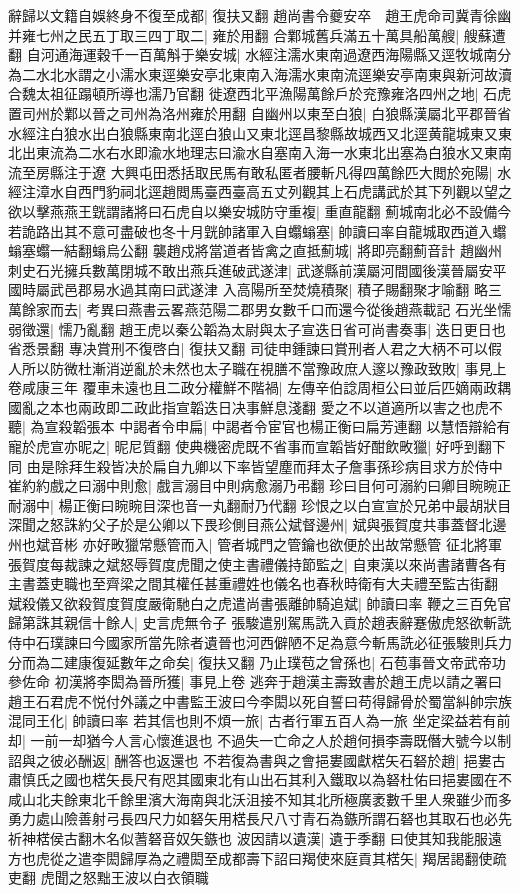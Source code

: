 辭歸以文籍自娛終身不復至成都|{
	復扶又翻}
趙尚書令夔安卒　趙王虎命司冀青徐幽并雍七州之民五丁取三四丁取二|{
	雍於用翻}
合鄴城舊兵滿五十萬具船萬艘|{
	艘蘇遭翻}
自河通海運穀千一百萬斛于樂安城|{
	水經注濡水東南過遼西海陽縣又逕牧城南分為二水北水謂之小濡水東逕樂安亭北東南入海濡水東南流逕樂安亭南東與新河故瀆合魏太祖征蹋頓所導也濡乃官翻}
徙遼西北平漁陽萬餘戶於兖豫雍洛四州之地|{
	石虎置司州於鄴以晉之司州為洛州雍於用翻}
自幽州以東至白狼|{
	白狼縣漢屬北平郡晉省水經注白狼水出白狼縣東南北逕白狼山又東北逕昌黎縣故城西又北逕黄龍城東又東北出東流為二水右水即渝水地理志曰渝水自塞南入海一水東北出塞為白狼水又東南流至房縣注于遼}
大興屯田悉括取民馬有敢私匿者腰斬凡得四萬餘匹大閲於宛陽|{
	水經注漳水自西門豹祠北逕趙閲馬臺西臺高五丈列觀其上石虎講武於其下列觀以望之}
欲以擊燕燕王皝謂諸將曰石虎自以樂安城防守重複|{
	重直龍翻}
薊城南北必不設備今若詭路出其不意可盡破也冬十月皝帥諸軍入自蠮螉塞|{
	帥讀曰率自龍城取西道入蠮螉塞蠮一結翻螉烏公翻}
襲趙戍將當道者皆禽之直抵薊城|{
	將即亮翻薊音計}
趙幽州刺史石光擁兵數萬閉城不敢出燕兵進破武遂津|{
	武遂縣前漢屬河間國後漢晉屬安平國時屬武邑郡易水過其南曰武遂津}
入高陽所至焚燒積聚|{
	積子賜翻聚才喻翻}
略三萬餘家而去|{
	考異曰燕書云畧燕范陽二郡男女數千口而還今從後趙燕載記}
石光坐懦弱徵還|{
	懦乃亂翻}
趙王虎以秦公韜為太尉與太子宣迭日省可尚書奏事|{
	迭日更日也省悉景翻}
專决賞刑不復啓白|{
	復扶又翻}
司徒申鍾諫曰賞刑者人君之大柄不可以假人所以防微杜漸消逆亂於未然也太子職在視膳不當豫政庶人邃以豫政致敗|{
	事見上卷咸康三年}
覆車未遠也且二政分權鮮不階禍|{
	左傳辛伯諗周桓公曰並后匹嫡兩政耦國亂之本也兩政即二政此指宣韜迭日决事鮮息淺翻}
愛之不以道適所以害之也虎不聽|{
	為宣殺韜張本}
中謁者令申扁|{
	中謁者令宦官也楊正衡曰扁芳連翻}
以慧悟辯給有寵於虎宣亦昵之|{
	昵尼質翻}
使典機密虎既不省事而宣韜皆好酣飲畋獵|{
	好呼到翻下同}
由是除拜生殺皆决於扁自九卿以下率皆望塵而拜太子詹事孫珍病目求方於侍中崔約約戲之曰溺中則愈|{
	戲言溺目中則病愈溺乃弔翻}
珍曰目何可溺約曰卿目睕睕正耐溺中|{
	楊正衡曰睕睕目深也音一丸翻耐乃代翻}
珍恨之以白宣宣於兄弟中最胡狀目深聞之怒誅約父子於是公卿以下畏珍側目燕公斌督邊州|{
	斌與張賀度共事蓋督北邊州也斌音彬}
亦好畋獵常懸管而入|{
	管者城門之管鑰也欲便於出故常懸管}
征北將軍張賀度每裁諫之斌怒辱賀度虎聞之使主書禮儀持節監之|{
	自東漢以來尚書諸曹各有主書蓋吏職也至齊梁之間其權任甚重禮姓也儀名也春秋時衛有大夫禮至監古街翻}
斌殺儀又欲殺賀度賀度嚴衛馳白之虎遣尚書張離帥騎追斌|{
	帥讀曰率}
鞭之三百免官歸第誅其親信十餘人|{
	史言虎無令子}
張駿遣别駕馬詵入貢於趙表辭蹇傲虎怒欲斬詵侍中石璞諫曰今國家所當先除者遺晉也河西僻陋不足為意今斬馬詵必征張駿則兵力分而為二建康復延數年之命矣|{
	復扶又翻}
乃止璞苞之曾孫也|{
	石苞事晉文帝武帝功參佐命}
初漢將李閎為晉所獲|{
	事見上卷}
逃奔于趙漢主壽致書於趙王虎以請之署曰趙王石君虎不悦付外議之中書監王波曰今李閎以死自誓曰苟得歸骨於蜀當糾帥宗族混同王化|{
	帥讀曰率}
若其信也則不煩一旅|{
	古者行軍五百人為一旅}
坐定梁益若有前却|{
	一前一却猶今人言心懷進退也}
不過失一亡命之人於趙何損李壽既僭大號今以制詔與之彼必酬返|{
	酬答也返還也}
不若復為書與之會挹婁國獻楛矢石砮於趙|{
	挹婁古肅慎氏之國也楛矢長尺有咫其國東北有山出石其利入鐵取以為砮杜佑曰挹婁國在不咸山北夫餘東北千餘里濱大海南與北沃沮接不知其北所極廣袤數千里人衆雖少而多勇力處山險善射弓長四尺力如砮矢用楛長尺八寸青石為鏃所謂石砮也其取石也必先祈神楛侯古翻木名似蓍砮音奴矢鏃也}
波因請以遺漢|{
	遺于季翻}
曰使其知我能服遠方也虎從之遣李閎歸厚為之禮閎至成都壽下詔曰羯使來庭貢其楛矢|{
	羯居謁翻使疏吏翻}
虎聞之怒黜王波以白衣領職

